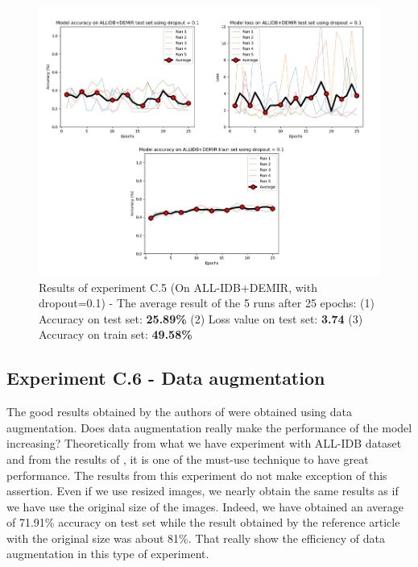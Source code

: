 \documentclass[11pt, openany]{report}
\theoremstyle{plain}
\theoremstyle{definition}
\theoremstyle{remark}
\begin{document}
\begin{figure}[H]
  \centering
  \includegraphics[scale=0.4]{Code/ch6-LeukemiaSubtypes/figures_result/LEUK-SUBTYPES/leukSub-dropout.PNG}
  \caption{Results of experiment C.5 (On ALL-IDB+DEMIR, with dropout=0.1) - The average result of the 5 runs after 25 epochs: (1) Accuracy on test set: \textbf{25.89\%} (2) Loss value on test set: \textbf{3.74} (3) Accuracy on train set: \textbf{49.58\%}}
  \label{fig:results-C5}
\end{figure}


\subsection{Experiment C.6 - Data augmentation}

The good results obtained by the authors of \citep{leukemia} were obtained using data augmentation. Does data augmentation really make the performance of the model increasing? Theoretically from what we have experiment with ALL-IDB dataset and from the results of \cite{leukemia}, it is one of the must-use technique to have great performance. The results from this experiment do not make exception of this assertion. Even if we use resized images, we nearly obtain the same results as if we have use the original size of the images. Indeed, we have obtained an average of 71.91\% accuracy on test set while the result obtained by the reference article \cite{leukemia} with the original size was about 81\%. That really show the efficiency of data augmentation in this type of experiment. 
\end{document}
